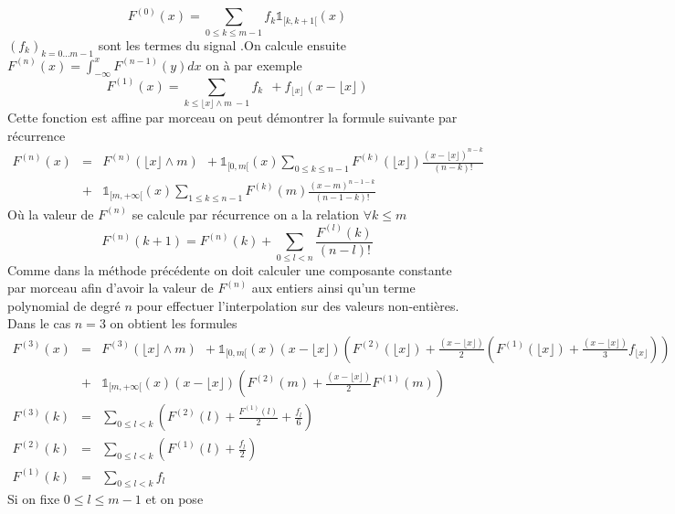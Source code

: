 \begin{equation*}
F^{(0)} (x) =\underset{0\le k \le m-1}{\sum}f_{k} \mathds{1}_{[k,k+1[}(x)
\end{equation*}
$(f_k)_{k=0...m-1}$ sont les termes du signal .On calcule ensuite $F^{(n)}(x)=\int_{-\infty}^{x}F^{(n-1)}(y)dx$ on à par exemple
\begin{equation*}
F^{(1)}(x)=\underset{k\le \lfloor x\rfloor \wedge m~-1}{\sum}f_{k}~~+ f_{\lfloor x\rfloor}
(x-\lfloor x\rfloor)
\end{equation*}
Cette fonction est affine par morceau on peut démontrer la formule suivante par récurrence
\begin{eqnarray*}
F^{(n)}(x) &=& F^{(n)}(\lfloor x\rfloor \wedge m)~~+\mathds{1}_{[0,m[}(x) \underset{0\le k \le n-1}{\sum}F^{(k)}(\lfloor x \rfloor) \frac{(x-\lfloor x \rfloor)^{n-k}}{(n-k)!}\\
          &+&\mathds{1}_{[m,+\infty[}(x)\underset{1\le k \le n-1}{\sum}F^{(k)}(m) \frac{(x-m)^{n-1-k}}{(n-1-k)!}
\end{eqnarray*}
Où la valeur de $F^{(n)}$ se calcule par récurrence on a la relation $\forall k\le m$
\begin{equation*}
F^{(n)}(k+1)=F^{(n)}(k)+\underset{0\le l < n}{\sum} \frac{F^{(l)}(k)}{(n-l)!}
\end{equation*}
Comme dans la méthode précédente on doit calculer une composante constante par morceau afin d'avoir la valeur de $F^{(n)}$ aux entiers  ainsi qu'un terme polynomial de degré $n$ pour effectuer l'interpolation sur des valeurs non-entières.\\
Dans le cas $n=3$ on obtient les formules
\begin{eqnarray*}
F^{(3)}(x)&=&F^{(3)}(\lfloor x\rfloor \wedge m)~~+\mathds{1}_{[0,m[}(x)(x-\lfloor x \rfloor) \left(F^{(2)}(\lfloor x \rfloor)+ \frac{(x-\lfloor x \rfloor)}{2}\left(F^{(1)}(\lfloor x \rfloor)+\frac{(x-\lfloor x \rfloor)}{3} f_{\lfloor x \rfloor}\right)\right)\\
          &+&\mathds{1}_{[m,+\infty[}(x)(x-\lfloor x \rfloor) \left(F^{(2)}(m)+ \frac{(x-\lfloor x \rfloor)}{2}F^{(1)}(m)\right) \\
F^{(3)}(k)&=&  \underset{0\le l<k}{\sum}\left(F^{(2)}(l)+\frac{F^{(1)}(l)}{2}+\frac{f_{l}}{6} \right)  \\
F^{(2)}(k)&=&  \underset{0\le l<k}{\sum}\left(F^{(1)}(l)+\frac{f_{l}}{2} \right)  \\
F^{(1)}(k)&=&  \underset{0\le l<k}{\sum}f_{l} 
\end{eqnarray*}
Si on fixe $0\le l\le m-1$ et on pose
